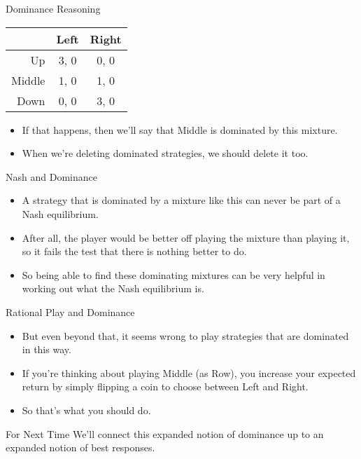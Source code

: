 \documentclass[
  ignorenonframetext,
]{beamer}
\providecommand{\tightlist}{%
  \setlength{\itemsep}{0pt}\setlength{\parskip}{0pt}}
\begin{document}
\begin{frame}{Dominance Reasoning}
\protect\hypertarget{dominance-reasoning-3}{}
\begin{table}[!h]
\centering
\begin{tabular}[t]{>{}r|cc}
\toprule
 & Left & Right\\
\midrule
Up & 3, 0 & 0, 0\\
Middle & 1, 0 & 1, 0\\
Down & 0, 0 & 3, 0\\
\bottomrule
\end{tabular}
\end{table}

\begin{itemize}
\tightlist
\item
  If that happens, then we'll say that Middle is dominated by this
  mixture.
\item
  When we're deleting dominated strategies, we should delete it too.
\end{itemize}
\end{frame}

\begin{frame}{Nash and Dominance}
\protect\hypertarget{nash-and-dominance}{}
\begin{itemize}
\tightlist
\item
  A strategy that is dominated by a mixture like this can never be part
  of a Nash equilibrium.
\item
  After all, the player would be better off playing the mixture than
  playing it, so it fails the test that there is nothing better to do.
\item
  So being able to find these dominating mixtures can be very helpful in
  working out what the Nash equilibrium is.
\end{itemize}
\end{frame}

\begin{frame}{Rational Play and Dominance}
\protect\hypertarget{rational-play-and-dominance}{}
\begin{itemize}
\tightlist
\item
  But even beyond that, it seems wrong to play strategies that are
  dominated in this way.
\item
  If you're thinking about playing Middle (as Row), you increase your
  expected return by simply flipping a coin to choose between Left and
  Right.
\item
  So that's what you should do.
\end{itemize}
\end{frame}

\begin{frame}{For Next Time}
\protect\hypertarget{for-next-time}{}
We'll connect this expanded notion of dominance up to an expanded notion
of best responses.
\end{frame}
\end{document}
